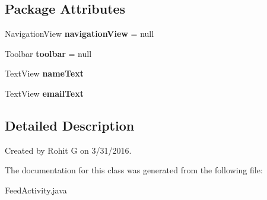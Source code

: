 \subsection*{\-Package \-Attributes}
\begin{DoxyCompactItemize}
\item 
\hypertarget{classcom_1_1example_1_1sel_1_1lostfound_1_1FeedActivity_a51b8f541b1fa87bae79552e02354112c}{\-Navigation\-View {\bfseries navigation\-View} = null}\label{classcom_1_1example_1_1sel_1_1lostfound_1_1FeedActivity_a51b8f541b1fa87bae79552e02354112c}

\item 
\hypertarget{classcom_1_1example_1_1sel_1_1lostfound_1_1FeedActivity_a8513e4158e73b84a7fd07415fded1478}{\-Toolbar {\bfseries toolbar} = null}\label{classcom_1_1example_1_1sel_1_1lostfound_1_1FeedActivity_a8513e4158e73b84a7fd07415fded1478}

\item 
\hypertarget{classcom_1_1example_1_1sel_1_1lostfound_1_1FeedActivity_ad25f59821cace19c4a041b416d524e6b}{\-Text\-View {\bfseries name\-Text}}\label{classcom_1_1example_1_1sel_1_1lostfound_1_1FeedActivity_ad25f59821cace19c4a041b416d524e6b}

\item 
\hypertarget{classcom_1_1example_1_1sel_1_1lostfound_1_1FeedActivity_aba980cd82976141d8376704b9b3a4561}{\-Text\-View {\bfseries email\-Text}}\label{classcom_1_1example_1_1sel_1_1lostfound_1_1FeedActivity_aba980cd82976141d8376704b9b3a4561}

\end{DoxyCompactItemize}


\subsection{\-Detailed \-Description}
\-Created by \-Rohit \-G on 3/31/2016. 

\-The documentation for this class was generated from the following file\-:\begin{DoxyCompactItemize}
\item 
\-Feed\-Activity.\-java\end{DoxyCompactItemize}
